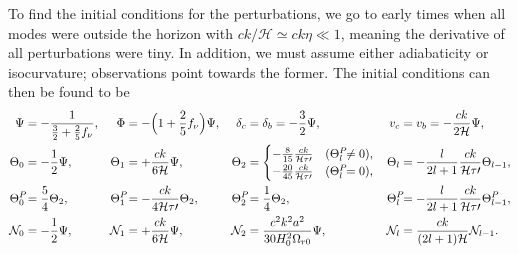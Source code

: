 \documentclass[10pt,a4paper]{article}
\begin{document}
To find the initial conditions for the perturbations,
we go to early times when all modes were outside the horizon with $ck/\mathcal{H} \simeq ck\eta \ll 1$,
meaning the derivative of all perturbations were tiny.
In addition, we must assume either adiabaticity or isocurvature; observations point towards the former.
The initial conditions can then be found to be
\begin{subequations}
\allowdisplaybreaks
\begin{align}
	\Psi &= -\frac{1}{\frac32 + \frac25 f_\nu}, &
	\Phi &= -\Big( 1 + \frac25 f_\nu \Big) \Psi, &
	\delta_c &= \delta_b = -\frac32 \Psi, &
	v_c &= v_b = -\frac{ck}{2\mathcal{H}} \Psi, \\
	\Theta_0 &= -\frac12 \Psi, &
	\Theta_1 &= +\frac{ck}{6\mathcal{H}} \Psi, &
	\Theta_2 &= \begin{cases} -\frac{8}{15} \frac{ck}{\mathcal{H} \tau\prime} & (\Theta^{\mathrlap{P}}_l \neq 0), \\ -\frac{20}{45} \frac{ck}{\mathcal{H} \tau\prime} & (\Theta^{\mathrlap{P}}_l = 0), \end{cases} &
	\Theta_l &= -\frac{l}{2l+1} \frac{ck}{\mathcal{H} \tau\prime} \Theta_{l-1}, \\
	\Theta^{\mathrlap{P}}_0 &= \frac54 \Theta_2, &
	\Theta^{\mathrlap{P}}_1 &= -\frac{ck}{4\mathcal{H}\tau\prime} \Theta_2, &
	\Theta^{\mathrlap{P}}_2 &= \frac14 \Theta_2, &
	\Theta^{\mathrlap{P}}_l &= -\frac{l}{2l+1} \frac{ck}{\mathcal{H}\tau\prime} \Theta^{\mathrlap{P}}_{l-1}, \\
	\N_0 &= -\frac12 \Psi, &
	\N_1 &= +\frac{ck}{6\mathcal{H}} \Psi, &
	\N_2 &=  \frac{c^2 k^2 a^2}{30 H_0^2 \Omega_{r0}} \Psi,&
	\N_l &= \frac{ck}{(2l+1)\mathcal{H}} \N_{l-1}.
\end{align}
\label{eq_perturb_ic}
\end{subequations}
\end{document}
